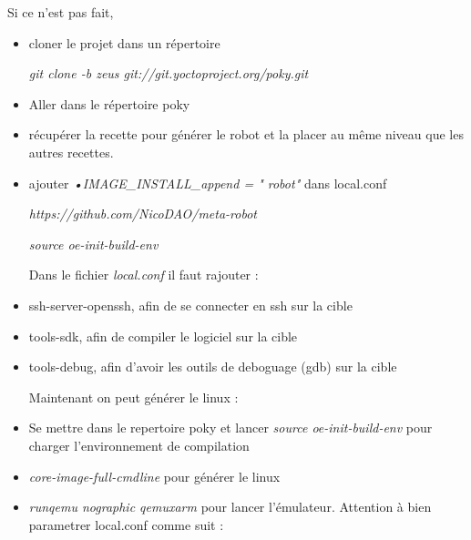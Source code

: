 Si ce n'est pas fait,
\begin{itemize}
\item 
 cloner le projet dans un répertoire


\textit{git clone -b zeus git://git.yoctoproject.org/poky.git}

\item 
Aller dans le répertoire poky

\item récupérer la recette pour générer le robot et la placer au même niveau que les autres recettes.

\item
ajouter \textit{•IMAGE\_INSTALL\_append = " robot"} dans local.conf

\textit{https://github.com/NicoDAO/meta-robot}

\textit{source oe-init-build-env}

Dans le fichier \textit{local.conf} il faut rajouter : 

\item ssh-server-openssh, afin de se connecter en ssh sur la cible
\item tools-sdk, afin de compiler le logiciel sur la cible
\item tools-debug, afin d'avoir les outils de deboguage (gdb) sur la cible




Maintenant on peut générer le linux : 
\item 
Se mettre dans le repertoire poky et lancer \textit{source oe-init-build-env} pour charger l'environnement de compilation

\item 
\textit{core-image-full-cmdline} pour générer le linux

\item 
\textit{runqemu nographic qemuxarm} pour lancer l'émulateur.
Attention à bien parametrer local.conf comme suit : 
\\




\end{itemize}

